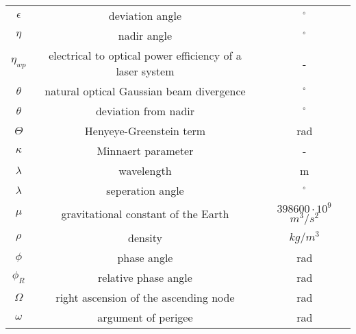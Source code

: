 \begin{center}
\begin{longtable}{c|c|c}
$\epsilon$                         	& deviation angle                          																& $^\circ$ \\

$\eta$ 															& nadir angle																															& $^\circ$ \\

$\eta_{wp}$                       	& electrical to optical power efficiency of a laser system  							& - \\

$\theta$                            & natural optical Gaussian beam divergence       													& $^\circ$ \\

$\theta$                            & deviation from nadir                             												&  $^\circ$ \\

$\Theta$                            & Henyeye-Greenstein term                           											& rad \\

$\kappa$                            & Minnaert parameter                  																		& - \\

$\lambda$ 													& wavelength																															& m \\

$\lambda$ 													& seperation angle																												& $^\circ$ \\ 

$\mu$														 		& gravitational constant of the Earth 																		& $398600\cdot 10^9$ $m^3/s^2$ \\

$\rho$ 															& density 																																& $kg/m^3$ \\

$\phi$ 															& phase angle 																														& rad \\
	
$\phi _R$														& relative phase angle 																										& rad \\
     
$\Omega$ 														& right ascension of the ascending node 																	& rad \\

$\omega$ 														& argument of perigee																											& rad \\


\end{longtable}
\end{center}
